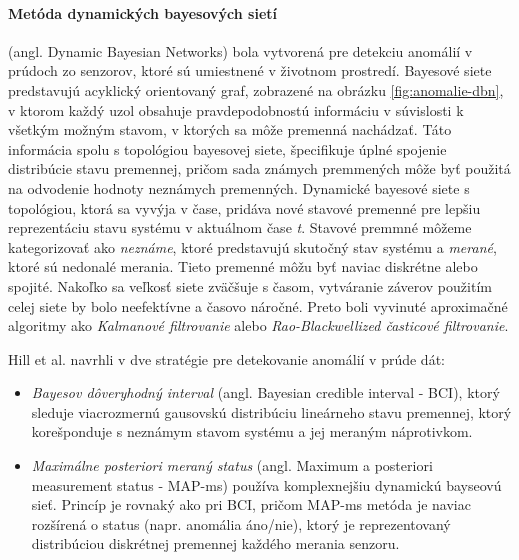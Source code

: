 \paragraph{Metóda dynamických bayesových sietí} (angl. Dynamic Bayesian Networks) \citep{hill2007real} bola vytvorená pre detekciu anomálií v prúdoch zo senzorov, ktoré sú umiestnené v životnom prostredí. Bayesové siete predstavujú acyklický orientovaný graf, zobrazené na obrázku \ref{fig:anomalie-dbn}, v ktorom každý uzol obsahuje pravdepodobnostú informáciu v súvislosti k všetkým možným stavom, v ktorých sa môže premenná nachádzať. Táto informácia spolu s topológiou bayesovej siete, špecifikuje úplné spojenie distribúcie stavu premennej, pričom sada známych premmených môže byť použitá na odvodenie hodnoty neznámych premenných. Dynamické bayesové siete s topológiou, ktorá sa vyvýja v čase, pridáva nové stavové premenné pre lepšiu reprezentáciu stavu systému v aktuálnom čase \textit{t}. Stavové premmné môžeme kategorizovať ako \textit{neznáme}, ktoré predstavujú skutočný stav systému a \textit{merané}, ktoré sú nedonalé merania. Tieto premenné môžu byť naviac diskrétne alebo spojité. Nakoľko sa veľkosť siete zväčšuje s časom, vytváranie záverov použitím celej siete by bolo neefektívne a časovo náročné. Preto boli vyvinuté aproximačné algoritmy ako \textit{Kalmanové filtrovanie} alebo \textit{Rao-Blackwellized časticové filtrovanie}. \par
Hill et al. navrhli v \citep{hill2007real} dve stratégie pre detekovanie anomálií v prúde dát:
\begin{itemize}
	\item \textit{Bayesov dôveryhodný interval} (angl. Bayesian credible interval - BCI), ktorý sleduje viacrozmernú gausovskú distribúciu lineárneho stavu premennej, ktorý korešponduje s neznámym stavom systému a jej meraným náprotivkom.
	\item \textit{Maximálne posteriori meraný status} (angl. Maximum a posteriori measurement status - MAP-ms) používa komplexnejšiu dynamickú bayseovú sieť. Princíp je rovnaký ako pri BCI, pričom MAP-ms metóda je naviac rozšírená o status (napr. anomália áno/nie), ktorý je reprezentovaný distribúciou diskrétnej premennej každého merania senzoru.
\end{itemize}
\label{fig:anomalie-dbn}


